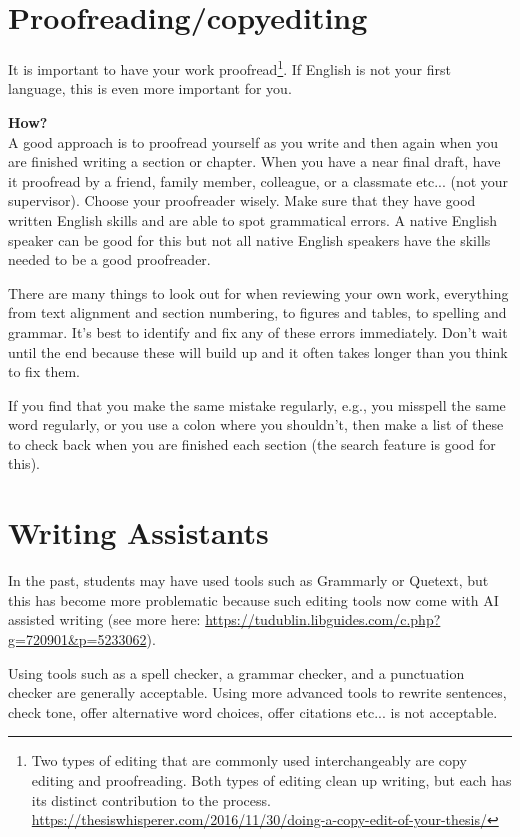 \section{Proofreading/copyediting} \label{app:proofreading}
It is important to have your work proofread\footnote{Two types of editing that
	are commonly used interchangeably are copy editing and proofreading. Both types
	of editing clean up writing, but each has its distinct contribution to the
	process.
	\url{https://thesiswhisperer.com/2016/11/30/doing-a-copy-edit-of-your-thesis/}}.
If English is not your first language, this is even more important for you.

\textbf{How?}\\
A good approach is to proofread yourself as you write and then again when you are finished writing a section or chapter. When you have a near final draft, have it proofread by a friend, family member, colleague, or a classmate etc... (not your supervisor). Choose your proofreader wisely. Make sure that they have good written English skills and are able to spot grammatical errors. A native English speaker can be good for this but not all native English speakers have the skills needed to be a good proofreader.

There are many things to look out for when reviewing your own work, everything
from text alignment and section numbering, to figures and tables, to spelling
and grammar. It's best to identify and fix any of these errors immediately.
Don't wait until the end because these will build up and it often takes longer
than you think to fix them.

If you find that you make the same mistake regularly, e.g., you misspell the
same word regularly, or you use a colon where you shouldn't, then make a list
of these to check back when you are finished each section (the search feature
is good for this).

\newpage
\section{Writing Assistants} \label{App:writing_assist}
In the past, students may have used tools such as Grammarly or Quetext, but
this has become more problematic because such editing tools now come with AI
assisted writing (see more here:
\url{https://tudublin.libguides.com/c.php?g=720901&p=5233062}).

Using tools such as a spell checker, a grammar checker, and a punctuation
checker are generally acceptable. Using more advanced tools to rewrite
sentences, check tone, offer alternative word choices, offer citations etc...
is not acceptable.

